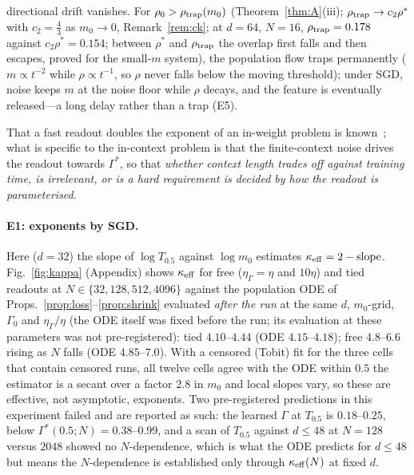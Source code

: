 \begin{proposition}
\begin{enumerate}
directional drift vanishes. For $\rho_0>\rho_{\rm trap}(m_0)$ (Theorem~\ref{thm:A}(iii); $\rho_{\rm trap}\to c_2\rho^*$ with $c_2=\tfrac43$ as $m_0\to0$, Remark~\ref{rem:ck}; at $d=64$, $N=16$, $\rho_{\rm trap}=0.178$ against $c_2\rho^*=0.154$; between $\rho^*$ and $\rho_{\rm trap}$ the overlap first
falls and then escapes, proved for the small-$m$ system), the population flow traps permanently ($m\propto t^{-2}$ while $\rho\propto t^{-1}$, so $\rho$ never falls below the
moving threshold); under SGD,
noise keeps $m$ at the noise floor while $\rho$ decays, and the feature is eventually released---a long delay rather than a trap (E5).
\end{enumerate}
\end{proposition}
That a fast readout doubles the exponent of an in-weight problem is
known~\citep[\S5]{bietti2023learning}; what is specific to the in-context problem is that the finite-context noise drives the
readout towards $\Gamma^*$, so that \emph{whether context length trades off against training time, is irrelevant, or is a
hard requirement is decided by how the readout is parameterised}.

\paragraph{E1: exponents by SGD.}
Here ($d=32$) the slope of $\log T_{0.5}$ against $\log m_0$ estimates $\kappa_{\rm eff}=2-\text{slope}$. Fig.~\ref{fig:kappa} (Appendix) shows $\kappa_{\rm eff}$ for free
($\eta_\Gamma=\eta$ and $10\eta$) and tied readouts at $N\in\{32,128,512,4096\}$ against the population ODE of
Props.~\ref{prop:loss}--\ref{prop:shrink} evaluated \emph{after the run} at the same $d$, $m_0$-grid, $\Gamma_0$ and $\eta_\Gamma/\eta$ (the ODE
itself was fixed before the run; its evaluation at these parameters was not pre-registered): tied $4.10$--$4.44$ (ODE $4.15$--$4.18$); free
$4.8$--$6.6$ rising as $N$ falls (ODE $4.85$--$7.0$).
With a censored (Tobit) fit for the three cells that contain censored runs, all twelve cells agree with the ODE within $0.5$
the estimator is a
secant over a factor $2.8$ in $m_0$ and local slopes vary, so these are effective, not asymptotic, exponents.
Two pre-registered predictions in this experiment failed and are
reported as such: the learned $\Gamma$ at $T_{0.5}$ is $0.18$--$0.25$, below $\Gamma^*(0.5;N)=0.38$--$0.99$, and a scan of $T_{0.5}$ against $d\le48$ at $N=128$ versus $2048$ showed
no $N$-dependence, which is what the ODE predicts for $d\le48$ but means the $N$-dependence is
established only through $\kappa_{\rm eff}(N)$ at fixed $d$.

